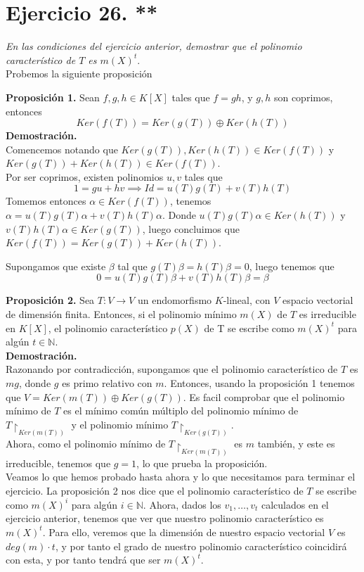 \section{Ejercicio 26. **} \textit{En las condiciones del ejercicio anterior,
  demostrar que el polinomio característico de \(T\) es \(m(X)^t\)}.\\

Probemos la siguiente proposición

\textbf{Proposición 1. }Sean \(f,g,h \in K[X]\) tales que \(f = gh\), y \(g,h\) son
coprimos, entonces
\[
  Ker(f(T)) = Ker(g(T)) \oplus Ker(h(T))
\]
\textbf{Demostración.}\\
Comencemos notando que \(Ker(g(T)), Ker(h(T)) \in Ker(f(T))\) y \(Ker(g(T)) +
Ker(h(T)) \in Ker(f(T))\).\\ Por ser coprimos, existen polinomios \(u,v\) tales
que
\[
  1 = gu + hv \implies Id = u(T)g(T) + v(T)h(T)
\]
Tomemos entonces \(\alpha \in Ker(f(T))\), tenemos \(\alpha = u(T)g(T)\alpha +
v(T)h(T)\alpha\).
Donde  \( u(T)g(T)\alpha \in Ker(h(T))\) y  \( v(T)h(T)\alpha \in Ker(g(T))\),
luego concluimos que \(Ker(f(T)) = Ker(g(T)) + Ker(h(T))\).

Supongamos que existe \(\beta\) tal que \(g(T)\beta = h(T)\beta = 0\), luego
tenemos que
\[
  0 = u(T)g(T)\beta + v(T)h(T)\beta = \beta
\]

\textbf{Proposición 2.} Sea \(T: V \rightarrow V \) un endomorfismo \(K\)-lineal, con \(V\) espacio vectorial de dimensión finita. Entonces, si el polinomio mínimo \(m(X)\) de  \(T\) es irreducible en  \(K[X]\), el polinomio característico \(p(X)\) de T se escribe como \(m(X)^t\) para algún \(t \in \mathbb{N}\).\\

\textbf{Demostración.}\\
Razonando por contradicción, supongamos que el polinomio característico de \(T\) es  \(mg\), donde  \(g\) es primo relativo con \(m\). Entonces, usando la proposición 1 tenemos que \(V = Ker(m(T)) \oplus Ker(g(T))\). Es facil comprobar que el polinomio mínimo de \(T\) es el mínimo común múltiplo del polinomio mínimo de \(T\restriction_{Ker(m(T))}\) y el polinomio mínimo \(T\restriction_{Ker(g(T))}\).\\

Ahora, como el polinomio mínimo de \(T\restriction_{Ker(m(T))}\) es \(m\) también, y este es irreducible, tenemos que \(g = 1\), lo que prueba la proposición.\\

Veamos lo que hemos probado hasta ahora y lo que necesitamos para terminar el ejercicio. La proposición 2 nos dice que el polinomio característico de \(T\) se escribe como \(m(X)^i\) para algún \(i \in \mathbb{N}\). Ahora, dados los \(v_1, \dots, v_t\) calculados en el ejercicio anterior, tenemos que ver que nuestro polinomio característico es \(m(X)^t\). Para ello, veremos que la dimensión de nuestro espacio vectorial \(V\) es  \(deg(m) \cdot t\), y por tanto el grado de nuestro polinomio característico coincidirá con esta, y por tanto tendrá que ser \(m(X)^t\).


